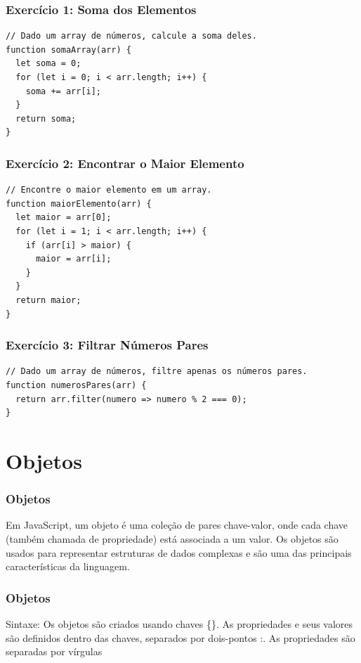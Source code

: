 \documentclass[13pt, xcolor={dvipsnames,svgnames}, portuguese]{beamer}
\begin{document}
\begin{frame}[fragile]
\frametitle{Exercício 1: Soma dos Elementos}
\begin{verbatim}
// Dado um array de números, calcule a soma deles.
function somaArray(arr) {
  let soma = 0;
  for (let i = 0; i < arr.length; i++) {
    soma += arr[i];
  }
  return soma;
}
\end{verbatim}
\end{frame}
\begin{frame}[fragile]
\frametitle{Exercício 2: Encontrar o Maior Elemento}
\begin{verbatim}
// Encontre o maior elemento em um array.
function maiorElemento(arr) {
  let maior = arr[0];
  for (let i = 1; i < arr.length; i++) {
    if (arr[i] > maior) {
      maior = arr[i];
    }
  }
  return maior;
}
\end{verbatim}
\end{frame}

\begin{frame}[fragile]
\frametitle{Exercício 3: Filtrar Números Pares}
\begin{verbatim}
// Dado um array de números, filtre apenas os números pares.
function numerosPares(arr) {
  return arr.filter(numero => numero % 2 === 0);
}
\end{verbatim}
\end{frame}



\section{Objetos}
\begin{frame}[fragile]
\frametitle{Objetos}
Em JavaScript, um objeto é uma coleção de pares chave-valor, onde cada chave (também chamada de propriedade) está associada a um valor. Os objetos são usados para representar estruturas de dados complexas e são uma das principais características da linguagem.
\end{frame}



\begin{frame}[fragile]
\frametitle{Objetos}
Sintaxe: Os objetos são criados usando chaves \{\}. As propriedades e seus valores são definidos dentro das chaves, separados por dois-pontos :. As propriedades são separadas por vírgulas
\end{frame}
\end{document}
